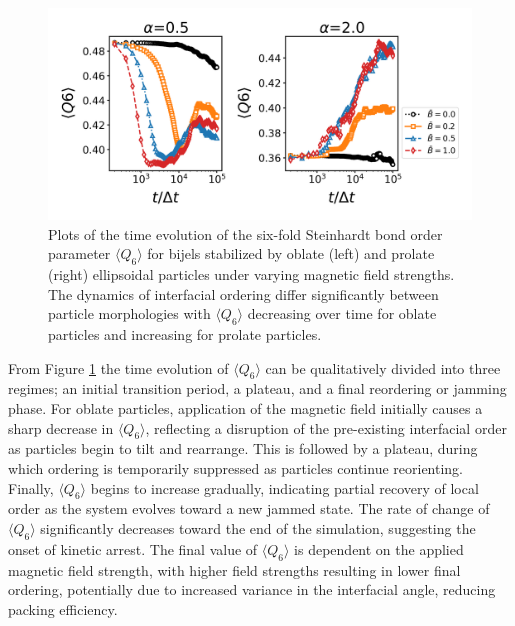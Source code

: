 \begin{figure} 
    \centering 
    \includegraphics[scale=0.6]{../figures/results/paper2/Q6-field_on.png} 
    \caption{Plots of the time evolution of the six-fold Steinhardt bond order parameter \(\langle Q_6 \rangle\) for bijels 
             stabilized by oblate (left) and prolate (right) ellipsoidal particles under varying magnetic field strengths. The dynamics of interfacial ordering differ 
             significantly between particle morphologies with \(\langle Q_6 \rangle\) decreasing over time for oblate particles and increasing for prolate particles.} 
    \label{fig:Q6-field_on} 
\end{figure}

From Figure \ref{fig:Q6-field_on} the time evolution of \(\langle Q_6 \rangle\) can be qualitatively divided into three regimes;
an initial transition period, a plateau, and a final reordering or jamming phase.
For oblate particles, application of the magnetic field initially causes a sharp decrease in \(\langle Q_6 \rangle\), reflecting a disruption of the 
pre-existing interfacial order as particles begin to tilt and rearrange. This is followed by a plateau, during which ordering is temporarily suppressed 
as particles continue reorienting. Finally, \(\langle Q_6 \rangle\) begins to increase gradually, indicating partial recovery of local order as the system 
evolves toward a new jammed state. The rate of change of \(\langle Q_6 \rangle\) significantly decreases toward the end of the simulation, suggesting the onset 
of kinetic arrest. The final value of \(\langle Q_6 \rangle\) is dependent on the applied magnetic field strength, with higher field strengths 
resulting in lower final ordering, potentially due to increased variance in the interfacial angle, reducing packing efficiency.

